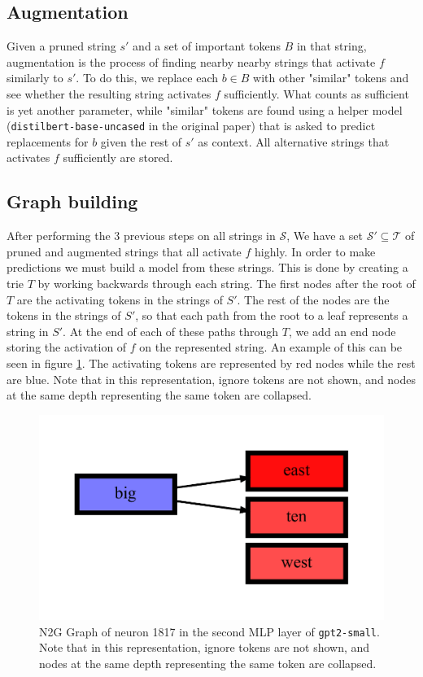 \subsection{Augmentation}
Given a pruned string $s'$ and a set of important tokens $B$ in that string, 
augmentation is the process of finding nearby nearby strings 
that activate $f$ similarly to $s'$.
To do this, we replace each $b\in B$ with other "similar" tokens and 
see whether the resulting string activates $f$ sufficiently.
What counts as sufficient is yet another parameter, 
while "similar" tokens are found using a helper model 
(\texttt{distilbert-base-uncased} in the original paper) 
that is asked to predict replacements for $b$ 
given the rest of $s'$ as context.
All alternative strings that activates $f$ sufficiently are stored.

\subsection{Graph building}
After performing the 3 previous steps on all strings in $\mathcal S$, 
We have a set $\mathcal S'\subseteq\mathcal T$ 
of pruned and augmented strings that all activate $f$ highly.
In order to make predictions we must build a model from these strings.
This is done by creating a trie $T$ 
by working backwards through each string.
The first nodes after the root of $T$ are the activating tokens 
in the strings of $S'$.
The rest of the nodes are the tokens in the strings of $S'$, 
so that each path from the root to a leaf represents a string in $S'$.
At the end of each of these paths through $T$, 
we add an end node storing the activation of $f$ on the represented string.
An example of this can be seen in figure \ref{fig:n2g_graph_gpt2-small_2_1817}.
The activating tokens are represented by red nodes while the rest are blue.
Note that in this representation, ignore tokens are not shown, and nodes at the same depth representing the same token are collapsed.

\begin{figure}[ht]
    \centering
    \includegraphics[width=\textwidth]{images/gpt2-small_2_1817.pdf}
    \caption{N2G Graph of neuron 1817 in the second MLP layer of \texttt{gpt2-small}. 
    Note that in this representation, ignore tokens are not shown, and nodes at the same depth representing the same token are collapsed.}
    \label{fig:n2g_graph_gpt2-small_2_1817}
\end{figure}

